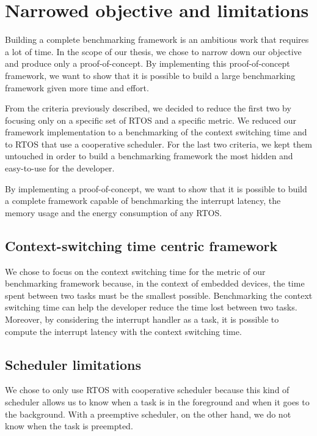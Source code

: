 \section{Narrowed objective and limitations}

Building a complete benchmarking framework is an ambitious work that requires a lot of time.
In the scope of our thesis, we chose to narrow down our objective and produce only a proof-of-concept.
By implementing this proof-of-concept framework, we want to show that it is possible to build a large benchmarking framework given more time and effort.

From the criteria previously described, we decided to reduce the first two by focusing only on a specific set of RTOS and a specific metric.
We reduced our framework implementation to a benchmarking of the context switching time and to RTOS that use a cooperative scheduler.
For the last two criteria, we kept them untouched in order to build a benchmarking framework the most hidden and easy-to-use for the developer.

By implementing a proof-of-concept, we want to show that it is possible to build a complete framework capable of benchmarking the interrupt latency, the memory usage and the energy consumption of any RTOS.

\subsection{Context-switching time centric framework}

We chose to focus on the context switching time for the metric of our benchmarking framework because, in the context of embedded devices, the time spent between two tasks must be the smallest possible.
Benchmarking the context switching time can help the developer reduce the time lost between two tasks.
Moreover, by considering the interrupt handler as a task, it is possible to compute the interrupt latency with the context switching time.

\subsection{Scheduler limitations}

We chose to only use RTOS with cooperative scheduler because this kind of scheduler allows us to know when a task is in the foreground and when it goes to the background.
With a preemptive scheduler, on the other hand, we do not know when the task is preempted.

